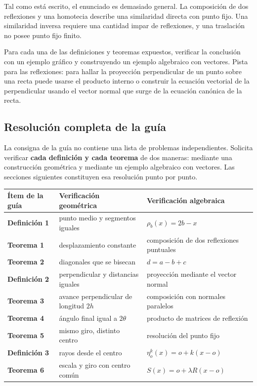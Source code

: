 \begin{atencion}
Tal como está escrito, el enunciado es demasiado general. La composición de dos reflexiones
y una homotecia describe una similaridad directa con punto fijo. Una similaridad inversa
requiere una cantidad impar de reflexiones, y una traslación no posee punto fijo finito.
\end{atencion}

\begin{enunciado}[Ejercicios]
Para cada una de las definiciones y teoremas expuestos, verificar la conclusión con un ejemplo
gráfico y construyendo un ejemplo algebraico con vectores. Pista para las reflexiones: para
hallar la proyección perpendicular de un punto sobre una recta puede usarse el producto
interno o construir la ecuación vectorial de la perpendicular usando el vector normal que
surge de la ecuación canónica de la recta.
\end{enunciado}

\subsection{Resolución completa de la guía}

La consigna de la guía no contiene una lista de problemas independientes. Solicita verificar
\textbf{cada definición y cada teorema} de dos maneras: mediante una construcción geométrica
y mediante un ejemplo algebraico con vectores. Las secciones siguientes constituyen esa
resolución punto por punto.

\begin{center}
\begin{tabularx}{\textwidth}{>{\bfseries}p{34mm} X X}
\toprule
Ítem de la guía & Verificación geométrica & Verificación algebraica\\
\midrule
Definición 1 & punto medio y segmentos iguales & \(\rho_b(x)=2b-x\)\\
Teorema 1 & desplazamiento constante & composición de dos reflexiones puntuales\\
Teorema 2 & diagonales que se bisecan & \(d=a-b+c\)\\
Definición 2 & perpendicular y distancias iguales & proyección mediante el vector normal\\
Teorema 3 & avance perpendicular de longitud \(2h\) & composición con normales paralelos\\
Teorema 4 & ángulo final igual a \(2\theta\) & producto de matrices de reflexión\\
Teorema 5 & mismo giro, distinto centro & resolución del punto fijo\\
Definición 3 & rayos desde el centro & \(\eta_o^k(x)=o+k(x-o)\)\\
Teorema 6 & escala y giro con centro común & \(S(x)=o+\lambda R(x-o)\)\\
\bottomrule
\end{tabularx}
\end{center}

